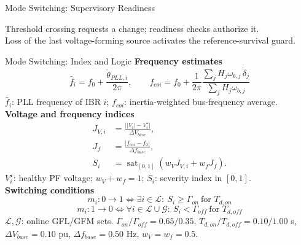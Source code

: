 \documentclass{beamer}
\begin{document}
\begin{frame}{Mode Switching: Supervisory Readiness}
\centering\small
{}
\vspace{.30cm}
\footnotesize Threshold crossing requests a change; readiness checks authorize it.\\
Loss of the last voltage-forming source activates the reference-survival guard.
\end{frame}

\begin{frame}{Mode Switching: Index and Logic}
\footnotesize
\textbf{Frequency estimates}
\[\hat f_i=f_0+\frac{\dot\theta_{PLL,i}}{2\pi},\qquad f_{coi}=f_0+\frac{1}{2\pi}\frac{\sum_jH_j\omega_{b,j}\,\dot\delta_j}{\sum_jH_j\omega_{b,j}}\]
\vspace{-.35cm}
\scriptsize $\hat f_i$: PLL frequency of IBR $i$; $f_{coi}$: inertia-weighted bus-frequency average.\\[.12cm]
\footnotesize\textbf{Voltage and frequency indices}
\begin{align*}
J_{V,i}&=\frac{\bigl||V_i|-V_i^\star\bigr|}{\Delta V_{base}},\\
J_f&=\frac{|f_{coi}-f_0|}{\Delta f_{base}},\\
S_i&=\operatorname{sat}_{[0,1]}(w_VJ_{V,i}+w_fJ_f).
\end{align*}
\vspace{-.25cm}
\scriptsize $V_i^\star$: healthy PF voltage; $w_V+w_f=1$; $S_i$: severity index in $[0,1]$.\\[.12cm]
\footnotesize\textbf{Switching conditions}
\[m_i:0\to1\iff\exists i\in\mathcal L:\ S_i\ge\Gamma_{on}\ \text{for }T_{d,on}\]
\[m_i:1\to0\iff\forall i\in\mathcal L\cup\mathcal G:\ S_i<\Gamma_{off}\ \text{for }T_{d,off}\]
\vspace{-.25cm}
\scriptsize $\mathcal L,\mathcal G$: online GFL/GFM sets. $\Gamma_{on}/\Gamma_{off}=0.65/0.35$, $T_{d,on}/T_{d,off}=0.10/1.00$ s, $\Delta V_{base}=0.10$ pu, $\Delta f_{base}=0.50$ Hz, $w_V=w_f=0.5$.
\end{frame}
\end{document}
